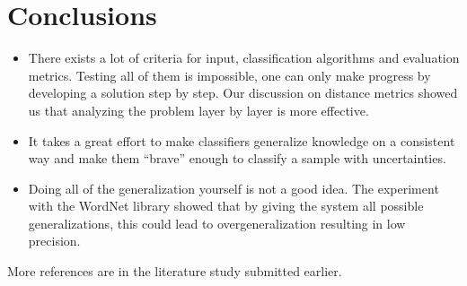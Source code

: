 \documentclass[a4paper,titlepage]{article}
\begin{document}
\section{Conclusions}
\begin{itemize}
 \item There exists a lot of criteria for input, classification algorithms and evaluation metrics. Testing all of them is impossible, one can only make progress by developing a solution step by step. Our discussion on distance metrics showed us that analyzing the problem layer by layer is more effective.
 \item It takes a great effort to make classifiers generalize knowledge on a consistent way and make them ``brave'' enough to classify a sample with uncertainties.
 \item Doing all of the generalization yourself is not a good idea. The experiment with the WordNet library showed that by giving the system all possible generalizations, this could lead to overgeneralization resulting in low precision.
\end{itemize}
\nocite{*}


More references are in the literature study submitted earlier.
\end{document}
